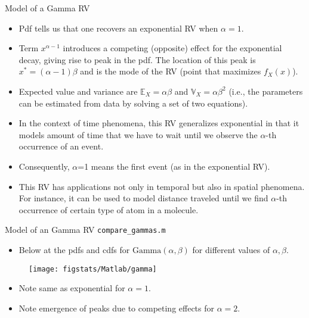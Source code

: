 \documentclass[9pt]{beamer}
\begin{document}
%
\begin{frame}{Model of a Gamma RV}

\begin{itemize}
\setlength{\itemsep}{10pt}
\item Pdf tells us that one recovers an exponential RV when $\alpha=1$. 
\item Term $x^{\alpha-1}$ introduces a competing (opposite) effect for the exponential decay, giving rise to peak in the pdf. The location of this peak is $x^*=(\alpha-1)\beta$ and is the mode of the RV (point that maximizes $f_X(x)$). 
\item Expected value and variance are $\mathbb{E}_X=\alpha\beta$ and $\mathbb{V}_X=\alpha\beta^2$ (i.e., the parameters can be estimated from data by solving a set of two equations). 
\item In the context of time phenomena, this RV generalizes exponential in that it models amount of time that we have to wait until we observe the $\alpha$-th occurrence of an event. 
\item Consequently, $\alpha$=1 means the first event (as in the exponential RV). 
\item This RV has applications not only in temporal but also in spatial phenomena. For instance, it can be used to model distance traveled until we find $\alpha$-th occurrence of certain type of atom in a molecule.  
\end{itemize}

\end{frame}


%
\begin{frame}{Model of an Gamma RV \footnotesize{\texttt{compare\_gammas.m}}}
\begin{itemize}
\setlength{\itemsep}{10pt}
\item Below at the pdfs and cdfs for $\textrm{Gamma}(\alpha,\beta)$ for different values of $\alpha,\beta$.
\end{itemize}
\begin{figure}[!htb]
    \centering
	\texttt{[image: figstats/Matlab/gamma]}
\end{figure}
\begin{itemize}
\setlength{\itemsep}{10pt}
\item Note same as exponential for $\alpha=1$.
\item Note emergence of peaks due to competing effects for $\alpha=2$. 
\end{itemize}
\end{frame}
\end{document}
